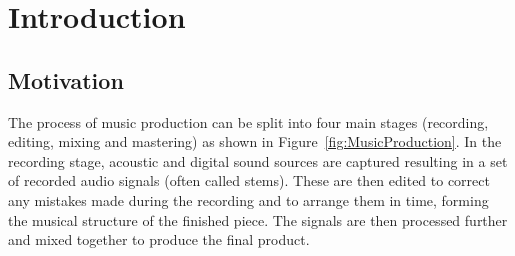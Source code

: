 \chapter{Introduction}
\label{chap:Introduction}

\section{Motivation}
\label{sec:Introduction-Motivation}
	The process of music production can be split into four main stages (recording, editing, mixing and mastering) as
	shown in Figure~\ref{fig:MusicProduction}. In the recording stage, acoustic and digital sound sources are captured
	resulting in a set of recorded audio signals (often called stems). These are then edited to correct any mistakes
	made during the recording and to arrange them in time, forming the musical structure of the finished piece. The
	signals are then processed further and mixed together to produce the final product.


